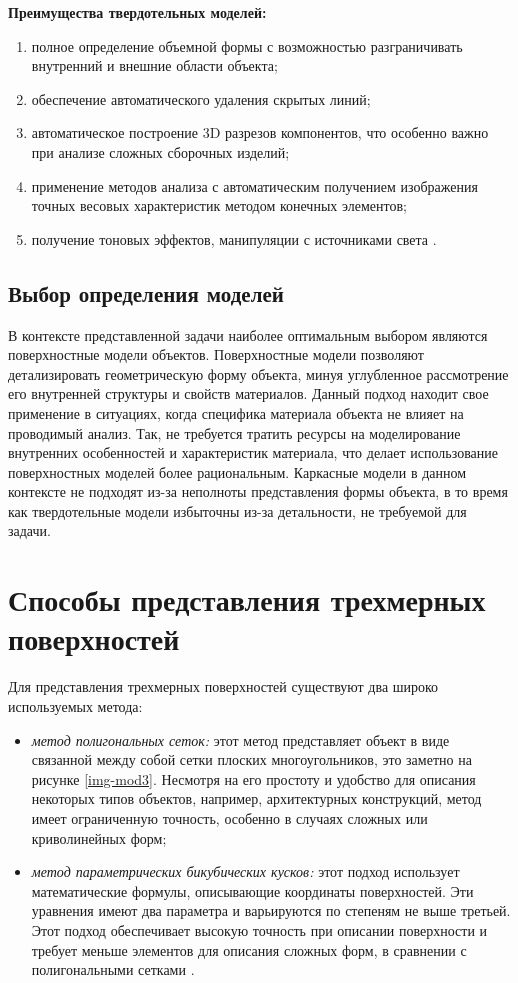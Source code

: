 \textbf{Преимущества твердотельных моделей:}
\begin{enumerate}
	\item полное определение объемной формы с возможностью разграничивать внутренний и внешние области объекта;
	\item  обеспечение автоматического удаления скрытых линий;
	\item автоматическое построение 3D разрезов компонентов, что особенно важно при анализе сложных сборочных изделий;
	\item  применение методов анализа с автоматическим получением изображения точных весовых характеристик методом конечных элементов;
	\item получение тоновых эффектов, манипуляции с источниками
	света \cite{model_geom_01}.
\end{enumerate}


\subsection{Выбор определения моделей} %
В контексте представленной задачи наиболее оптимальным выбором являются поверхностные модели объектов. Поверхностные модели позволяют детализировать геометрическую форму объекта, минуя углубленное рассмотрение его внутренней структуры и свойств материалов. Данный подход находит свое применение в ситуациях, когда специфика материала объекта не влияет на проводимый анализ. Так, не требуется тратить ресурсы на моделирование внутренних особенностей и характеристик материала, что делает использование поверхностных моделей более рациональным. Каркасные модели в данном контексте не подходят из-за неполноты представления формы объекта, в то время как твердотельные модели избыточны из-за детальности, не требуемой для задачи.


\section{Способы представления трехмерных поверхностей}

Для представления трехмерных поверхностей существуют два широко используемых метода:

\begin{itemize}
	\item \textit{метод полигональных сеток:} этот метод представляет объект в виде связанной между собой сетки плоских многоугольников, это заметно на рисунке  \ref{img-mod3}. Несмотря на его простоту и удобство для описания некоторых типов объектов, например, архитектурных конструкций, метод имеет ограниченную точность, особенно в случаях сложных или криволинейных форм;
	\item \textit{метод параметрических бикубических кусков: }этот подход использует математические формулы, описывающие координаты поверхностей. Эти уравнения имеют два параметра и варьируются по степеням не выше третьей. Этот подход обеспечивает высокую точность при описании поверхности и требует меньше элементов для описания сложных форм, в сравнении с полигональными сетками \cite{model_geom}.
\end{itemize}

